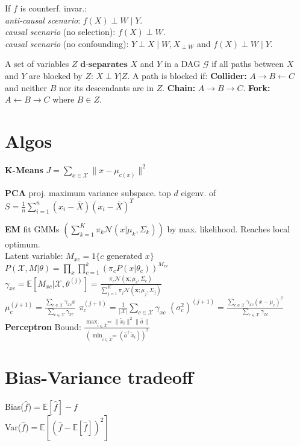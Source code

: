 If $f$ is counterf. invar.: \\
\textit{anti-causal scenario}: $f(X) {\perp} W {\mid} Y$. \\
\textit{causal scenario} (no selection): $f(X) {\perp} W$. \\
\textit{causal scenario} (no confounding): $Y \perp X \mid W, X_{\perp W}$ and $f(X) \perp W \mid Y$.

A set of variables $Z$ $\textbf{d-separates}$ $X$ and $Y$ in a DAG $\mathcal{G}$ if all paths between $X$ and $Y$ are blocked by $Z$: $ X{\perp} Y | Z$. A path is blocked if:
\textbf{Collider:} $A {\to} B {\leftarrow} C$ and neither $B$ nor its descendants are in $Z$.
\textbf{Chain:} $A {\to} B {\to} C$. \textbf{Fork:} $A {\leftarrow} B {\to} C$ where $B \in Z$.

\section*{Algos}
\textbf{K-Means} 
$J {=} \sum_{x \in \mathcal{X}} \| x - \mu_{c(x)} \|^2$

\textbf{PCA} proj. maximum variance subspace.
top $d$ eigenv. of $S {=} \frac{1}{n} \sum_{i=1}^{n} (x_i {-} \bar{X})(x_i {-} \bar{X})^T$

\textbf{EM} fit GMMs $(\sum_{k=1}^{K} \pi_k \mathcal{N}(x | \mu_k, \Sigma_k))$ by max. likelihood. Reaches local optimum.\\
Latent variable: $M_{xc} = 1\{c \text{ generated } x\}$ \\
$P(\mathcal{X}, M | \theta) {=} \prod_{x} \prod_{c=1}^{k} (\pi_c P(x | \theta_c))^{M_{xc}}$
$\gamma_{xc} {=} \mathbb{E}[M_{xc} | \mathcal{X}, \theta^{(j)}] {=} \frac{\pi_c \mathcal{N}(\mathbf{x}; \mu_c, \Sigma_c)}{\sum_{j=1}^K \pi_j \mathcal{N}(\mathbf{x}; \mu_j, \Sigma_j)}$ \\
$\mu_c^{(j+1)} {=} \frac{\sum_{c \in \mathcal{X}} \gamma_{xc} x}{\sum_{c \in \mathcal{X}} \gamma_{xc}}$
$\pi_c^{(j+1)} {=} \frac{1}{|\mathcal{X}|} \sum_{c \in \mathcal{X}} \gamma_{xc}$ 
$(\sigma_c^2)^{(j+1)} {=} \frac{\sum_{c \in \mathcal{X}} \gamma_{xc} (x - \mu_c)^2}{\sum_{c \in \mathcal{X}} \gamma_{xc}}$ \\


\textbf{Perceptron} Bound: $\frac{\max_{i \in \tilde{\mathcal{X}}^{mc}} \|\tilde{x}_i\|^2 \|\hat{a}\|}{(\min_{i \in \tilde{\mathcal{X}}^{mc}} (\hat{a}^\top \tilde{x}_i))^2}$


\section*{Bias-Variance tradeoff}
Bias($\hat{f}$)$=\mathbb{E}[\hat{f}]-f$\\
Var($\hat{f}$)$=\mathbb{E}[(\hat{f}-\mathbb{E}[\hat{f}])^2]$
